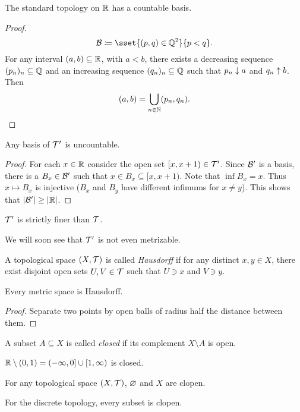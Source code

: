 
\begin{lemma}
    The standard topology on $\mathbb{R}$ has a countable basis.
\end{lemma}
\begin{proof}
    \[
        \mcB \coloneq \sset{(p, q) \in \Q^2}{p < q}.
    \] For any interval $(a, b) \subseteq \mathbb{R}$, with $a < b$, there exists
    a decreasing sequence $(p_n)_n \subseteq \mathbb{Q}$ and an increasing sequence
    $(q_n)_n \subseteq \mathbb{Q}$ such that $p_n \downarrow a$ and $q_n \uparrow b$.
    Then \[
        (a, b) = \bigcup_{n \in \mathbb{N}} (p_n, q_n). \qedhere
    \]
\end{proof}

\begin{lemma}
    Any basis of $\mathcal{T}'$ is uncountable.
\end{lemma}
\begin{proof}
    For each $x \in \mathbb{R}$ consider the open set $[x, x + 1) \in \mathcal{T}'$.
    Since $\mathcal{B}'$ is a basis, there is a $B_x \in \mathcal{B}'$ such that
    $x \in B_x \subseteq [x, x + 1)$.
    Note that $\inf B_x = x$.
    Thus $x \mapsto B_x$ is injective ($B_x$ and $B_y$ have different
    infimums for $x \ne y$).
    This shows that $\lvert\mathcal{B}'\rvert \ge \lvert\mathbb{R}\rvert$.
\end{proof}
\begin{corollary}
    $\mathcal{T}'$ is strictly finer than $\mathcal{T}$.
\end{corollary}
We will soon see that $\mathcal{T}'$ is not even metrizable.

\begin{definition}[Hausdorff] \label{def:hausdorff}
    A topological space $(X, \mathcal{T})$ is called \emph{Hausdorff} if for
    any distinct $x, y \in X$, there exist disjoint open sets
    $U, V \in \mathcal{T}$ such that $U \ni x$ and $V \ni y$.
\end{definition}

\begin{lemma}
    Every metric space is Hausdorff.
\end{lemma}
\begin{proof}
    Separate two points by open balls of radius half the distance
    between them.
\end{proof}

\begin{definition}[closed] \label{def:closed}
    A subset $A \subseteq X$ is called \emph{closed} if its
    complement $X \setminus A$ is open.
\end{definition}
\begin{examples}
    \item $\mathbb{R} \setminus (0, 1) = (-\infty, 0] \cup [1, \infty)$ is closed.
    \item For any topological space $(X, \mathcal{T})$,
        $\varnothing$ and $X$ are clopen.
    \item For the discrete topology, every subset is clopen.
\end{examples}

